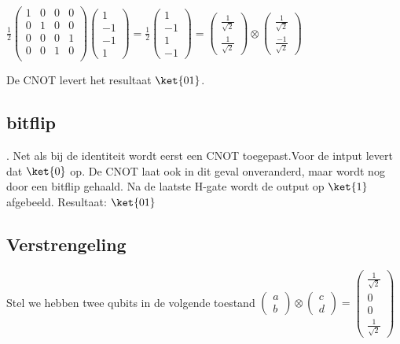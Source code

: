 $
\tfrac{1}{2}
\begin{pmatrix}
1&0&0&0\\
0&1&0&0\\
0&0&0&1\\
0&0&1&0\\
\end{pmatrix}
\begin{pmatrix}
1\\
-1\\
-1\\
1
\end{pmatrix}
=
\tfrac{1}{2}
\begin{pmatrix}
1\\
-1\\
1\\
-1
\end{pmatrix}
=
\begin{pmatrix} \tfrac{1}{\sqrt{2}}  \\ \tfrac{1}{\sqrt{2}} \end{pmatrix}
\otimes
\begin{pmatrix} \tfrac{1}{\sqrt{2}}  \\ \tfrac{-1}{\sqrt{2}} \end{pmatrix}
$

De CNOT levert het resultaat $\ket{01}$.

\subsection*{bitflip}.
Net als bij de identiteit wordt eerst een CNOT toegepast.Voor de intput levert dat $\ket{0}$ op. De CNOT laat ook in dit geval onveranderd, maar wordt nog door een bitflip gehaald. Na de laatste H-gate wordt de output op $\ket{1}$ afgebeeld. Resultaat: $\ket{01}$



\subsection*{Verstrengeling}

Stel we hebben twee qubits in de volgende toestand
$
\begin{pmatrix}
a  \\ 
b
\end{pmatrix}
\otimes
\begin{pmatrix}
c  \\ 
d
\end{pmatrix}
=
\begin{pmatrix} \tfrac{1}{\sqrt{2}}  \\ 
0 \\
0\\
\tfrac{1}{\sqrt{2}} 
\end{pmatrix}
$

